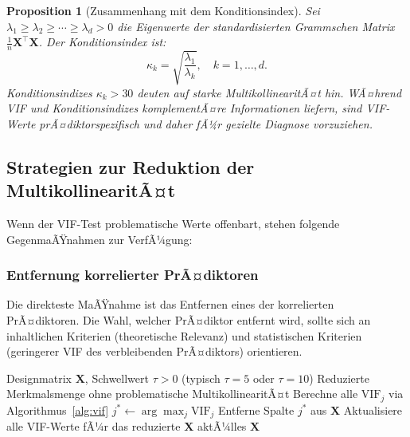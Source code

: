 ﻿\documentclass[12pt, a4paper]{article}
\newtheorem{proposition}[theorem]{Proposition}
\theoremstyle{definition}
\theoremstyle{remark}
\newcommand{\vX}{\bm{X}}
\newcommand{\T}{\top}
\begin{document}
\begin{proposition}[Zusammenhang mit dem Konditionsindex]
	Sei $\lambda_1 \geq \lambda_2 \geq \cdots \geq \lambda_d > 0$ die Eigenwerte der
	standardisierten Grammschen Matrix $\frac{1}{n}\vX^\T\vX$. Der \emph{Konditionsindex} ist:
	\[
	\kappa_k = \sqrt{\frac{\lambda_1}{\lambda_k}}, \quad k = 1, \ldots, d.
	\]
	Konditionsindizes $\kappa_k > 30$ deuten auf starke MultikollinearitÃ¤t hin. WÃ¤hrend
	VIF und Konditionsindizes komplementÃ¤re Informationen liefern, sind VIF-Werte prÃ¤diktorspezifisch
	und daher fÃ¼r gezielte Diagnose vorzuziehen.
\end{proposition}

\subsection{Strategien zur Reduktion der MultikollinearitÃ¤t}

Wenn der VIF-Test problematische Werte offenbart, stehen folgende GegenmaÃŸnahmen zur VerfÃ¼gung:

\subsubsection{Entfernung korrelierter PrÃ¤diktoren}

Die direkteste MaÃŸnahme ist das Entfernen eines der korrelierten PrÃ¤diktoren. Die Wahl,
welcher PrÃ¤diktor entfernt wird, sollte sich an inhaltlichen Kriterien (theoretische Relevanz)
und statistischen Kriterien (geringerer VIF des verbleibenden PrÃ¤diktors) orientieren.

\begin{algorithm}[H]
	\caption{Iterative VIF-basierte Variablenselektion}
	\label{alg:vif_selection}
	\begin{algorithmic}[1]
		\Require Designmatrix $\vX$, Schwellwert $\tau > 0$ (typisch $\tau = 5$ oder $\tau = 10$)
		\Ensure Reduzierte Merkmalsmenge ohne problematische MultikollinearitÃ¤t
		\State Berechne alle $\mathrm{VIF}_j$ via Algorithmus~\ref{alg:vif}
		\State $j^* \leftarrow \arg\max_j \mathrm{VIF}_j$
		\State Entferne Spalte $j^*$ aus $\vX$
		\State Aktualisiere alle VIF-Werte fÃ¼r das reduzierte $\vX$
		\EndWhile
		\State \Return aktÃ¼lles $\vX$
	\end{algorithmic}
\end{algorithm}
\end{document}
